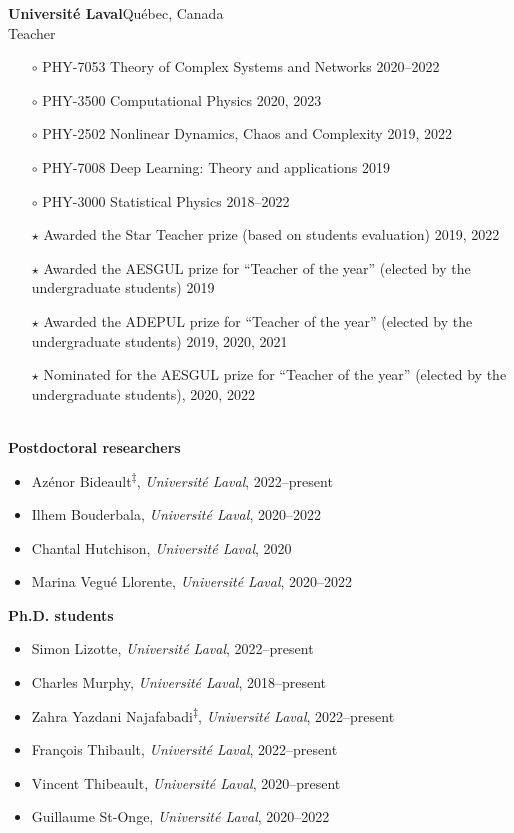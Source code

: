 \documentclass[11pt]{article}
\newcommand{\TitreSection}[1]{\colorbox{background}{\makebox[\textwidth-0.5em][c]{\Large\textrm{\textsc{#1}}}}\vspace{0.75\baselineskip}\\}
\begin{document}
%
\textbf{Universit\'e Laval}\hfill Qu\'ebec, Canada\\
Teacher
\begin{itemize}[leftmargin=1.5em]\small
  \item[$\circ$] PHY-7053 Theory of Complex Systems and Networks \hfill 2020--2022%
  \item[$\circ$] PHY-3500 Computational Physics \hfill 2020, 2023%
  \item[$\circ$] PHY-2502 Nonlinear Dynamics, Chaos and Complexity \hfill 2019, 2022%
  \item[$\circ$] PHY-7008 Deep Learning: Theory and applications \hfill 2019%
  \item[$\circ$] PHY-3000 Statistical Physics \hfill 2018--2022%
  \item[$\star$] Awarded the Star Teacher prize (based on students evaluation) 2019, 2022
  \item[$\star$] Awarded the AESGUL prize for ``Teacher of the year'' (elected by the undergraduate students) 2019
  \item[$\star$] Awarded the ADEPUL prize for ``Teacher of the year'' (elected by the undergraduate students) 2019, 2020, 2021
  \item[$\star$] Nominated for the AESGUL prize for ``Teacher of the year'' (elected by the undergraduate students), 2020, 2022
\end{itemize} \vspace{0.75\baselineskip}
%
%
%
%
%
\TitreSection{Mentoring\footnotemark}
%
%
\textbf{Postdoctoral researchers}
%
\begin{itemize}
  \item Azénor Bideault\textsuperscript{$\ddagger$}, \textit{Universit\'e Laval}, 2022--present
  \item Ilhem Bouderbala, \textit{Universit\'e Laval}, 2020--2022
  \item Chantal Hutchison, \textit{Université Laval}, 2020
  \item Marina Vegué Llorente, \textit{Université Laval}, 2020--2022
\end{itemize}
%
%
%
\textbf{Ph.D. students}
%
\begin{itemize}
  \item Simon Lizotte, \textit{Universit\'e Laval}, 2022--present
  \item Charles Murphy, \textit{Universit\'e Laval}, 2018--present
  \item Zahra Yazdani Najafabadi\textsuperscript{$\ddagger$}, \textit{Université Laval}, 2022--present
  \item Fran\c{c}ois Thibault, \textit{Universit\'e Laval}, 2022--present
  \item Vincent Thibeault, \textit{Université Laval}, 2020--present
  \item Guillaume St-Onge, \textit{Université Laval}, 2020--2022 \href{http://antoineallard.github.io/files/theses/StOnge.2022.PhD.pdf}{}
\end{itemize}
\end{document}
